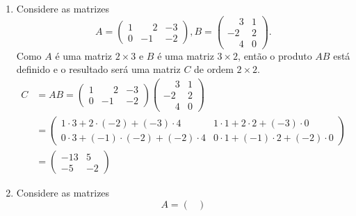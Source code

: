 \begin{exemplos}
    \begin{enumerate}
        \item Considere as matrizes
            \[
                A = \begin{pmatrix}
                    1 & \phantom{-}2 & -3\\
                    0 & -1 & -2
                \end{pmatrix},
                B = \begin{pmatrix}
                    \phantom{-}3 & 1\\
                    -2 & 2\\
                    \phantom{-}4 & 0
                \end{pmatrix}.
            \]
            Como $A$ é uma matriz $2 \times 3$ e $B$ é uma matriz $3 \times 2$, então o produto $AB$ está definido e o resultado será uma
            matriz $C$ de ordem $2 \times 2$.
            \begin{align*}
                C &= AB = \begin{pmatrix}
                    1 & \phantom{-}2 & -3\\
                    0 & -1 & -2
                \end{pmatrix}
                \begin{pmatrix}
                    \phantom{-}3 & 1\\
                    -2 & 2\\
                    \phantom{-}4 & 0
                \end{pmatrix} \\ &=
                \begin{pmatrix}
                    1\cdot 3 + 2\cdot(-2) + (-3)\cdot4 & 1\cdot 1 + 2\cdot 2 + (-3)\cdot 0\\
                    0\cdot 3 + (-1)\cdot(-2) + (-2) \cdot 4 & 0\cdot 1 + (-1)\cdot 2 + (-2)\cdot 0
                    \end{pmatrix}\\ &= \begin{pmatrix}
                        -13 & 5\\
                        -5 & -2
                    \end{pmatrix}
                \end{align*}
        \item Considere as matrizes
            \[
                A = \begin{pmatrix}

\end{pmatrix}\]
\end{enumerate}
\end{exemplos}
